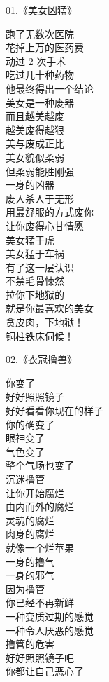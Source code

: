 \documentclass{ctexart}
\begin{document}
\begin{multicols}{2}
    \begin{center}
        01.《美女凶猛》\it

        跑了无数次医院 \\ 花掉上万的医药费 \\ 动过 2 次手术 \\ 吃过几十种药物 \\ 他最终得出一个结论 \\ 美女是一种废器 \\ 而且越美越废 \\ 越美废得越狠 \\ 美与废成正比 \\ 美女貌似柔弱 \\ 但柔弱能胜刚强 \\ 一身的凶器 \\ 废人杀人于无形 \\ 用最舒服的方式废你 \\ 让你废得心甘情愿 \\ 美女猛于虎 \\ 美女猛于车祸 \\ 有了这一层认识 \\ 不禁毛骨悚然 \\ 拉你下地狱的 \\ 就是你最喜欢的美女 \\ 贪皮肉，下地狱！ \\ 铜柱铁床伺候！
    \end{center}

    \begin{center}
        02.《衣冠撸兽》\it

        你变了 \\ 好好照照镜子 \\ 好好看看你现在的样子 \\ 你的确变了 \\ 眼神变了 \\ 气色变了 \\ 整个气场也变了 \\ 沉迷撸管 \\ 让你开始腐烂 \\ 由内而外的腐烂 \\ 灵魂的腐烂 \\ 肉身的腐烂 \\ 就像一个烂苹果 \\ 一身的撸气 \\ 一身的邪气 \\ 因为撸管 \\ 你已经不再新鲜 \\ 一种变质过期的感觉 \\ 一种令人厌恶的感觉 \\ 撸管的危害 \\ 好好照照镜子吧 \\ 你都让自己恶心了
    \end{center}


\end{multicols}
\end{document}
